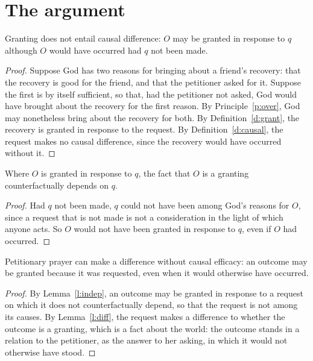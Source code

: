 \documentclass{situationist-preprint}
\begin{document}
\section{The argument}

\begin{lemma}\label{l:indep}
Granting does not entail causal difference: $O$ may be granted in response to $q$ although $O$ would have occurred had $q$ not been made.
\end{lemma}

\begin{proof}
Suppose God has two reasons for bringing about a friend's recovery: that the recovery is good for the friend, and that the petitioner asked for it. Suppose the first is by itself sufficient, so that, had the petitioner not asked, God would have brought about the recovery for the first reason. By Principle~\ref{p:over}, God may nonetheless bring about the recovery for both. By Definition~\ref{d:grant}, the recovery is granted in response to the request. By Definition~\ref{d:causal}, the request makes no causal difference, since the recovery would have occurred without it.
\end{proof}

\begin{lemma}\label{l:diff}
Where $O$ is granted in response to $q$, the fact that $O$ is a granting counterfactually depends on $q$.
\end{lemma}

\begin{proof}
Had $q$ not been made, $q$ could not have been among God's reasons for $O$, since a request that is not made is not a consideration in the light of which anyone acts. So $O$ would not have been granted in response to $q$, even if $O$ had occurred.
\end{proof}

\begin{theorem}\label{t:main}
Petitionary prayer can make a difference without causal efficacy: an outcome may be granted because it was requested, even when it would otherwise have occurred.
\end{theorem}

\begin{proof}
By Lemma~\ref{l:indep}, an outcome may be granted in response to a request on which it does not counterfactually depend, so that the request is not among its causes. By Lemma~\ref{l:diff}, the request makes a difference to whether the outcome is a granting, which is a fact about the world: the outcome stands in a relation to the petitioner, as the answer to her asking, in which it would not otherwise have stood.
\end{proof}
\end{document}
